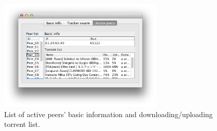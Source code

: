 \documentclass[twoside,a4paper,10pt]{article}
\begin{document}
\begin{figure}[!htp]
  \centering
  \includegraphics[width=0.7\textwidth]{imgs/tracker/activePeers.png}
  \caption{\label{fig:trackerPeersInfo}List of active peers' basic information and downloading/uploading torrent list.}
\end{figure}



\end{document}
